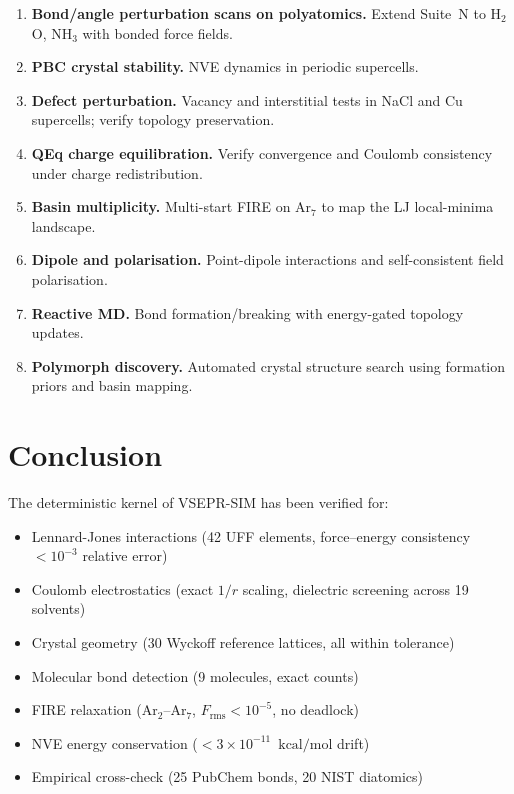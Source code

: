 \documentclass[11pt,twoside]{article}
\newcommand{\kcalmol}{\text{kcal/mol}}
\newcommand{\Frms}{F_{\mathrm{rms}}}
\begin{document}
\begin{enumerate}
  \item \textbf{Bond/angle perturbation scans on polyatomics.}  Extend
        Suite~N to H$_2$O, NH$_3$ with bonded force fields.
  \item \textbf{PBC crystal stability.}  NVE dynamics in periodic supercells.
  \item \textbf{Defect perturbation.}  Vacancy and interstitial tests in NaCl
        and Cu supercells; verify topology preservation.
  \item \textbf{QEq charge equilibration.}  Verify convergence and Coulomb
        consistency under charge redistribution.
  \item \textbf{Basin multiplicity.}  Multi-start FIRE on Ar$_7$ to map the
        LJ local-minima landscape.
  \item \textbf{Dipole and polarisation.}  Point-dipole interactions and
        self-consistent field polarisation.
  \item \textbf{Reactive MD.}  Bond formation/breaking with energy-gated
        topology updates.
  \item \textbf{Polymorph discovery.}  Automated crystal structure search
        using formation priors and basin mapping.
\end{enumerate}


\section{Conclusion}
\label{sec:conclusion}

The deterministic kernel of VSEPR-SIM has been verified for:

\begin{itemize}
  \item Lennard-Jones interactions (42 UFF elements, force--energy
        consistency $< 10^{-3}$ relative error)
  \item Coulomb electrostatics (exact $1/r$ scaling, dielectric screening
        across 19 solvents)
  \item Crystal geometry (30 Wyckoff reference lattices, all within
        tolerance)
  \item Molecular bond detection (9 molecules, exact counts)
  \item FIRE relaxation (Ar$_2$--Ar$_7$, $\Frms < 10^{-5}$, no deadlock)
  \item NVE energy conservation ($< 3 \times 10^{-11}$~$\kcalmol$ drift)
  \item Empirical cross-check (25 PubChem bonds, 20 NIST diatomics)
\end{itemize}
\end{document}
